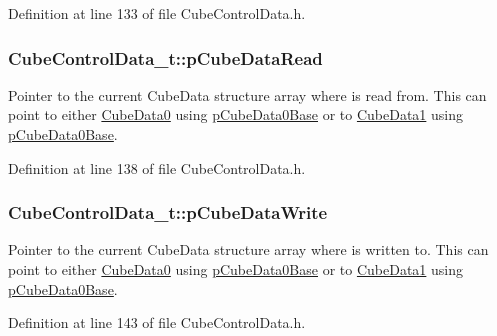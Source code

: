 Definition at line 133 of file Cube\+Control\+Data.\+h.

\hypertarget{struct_cube_control_data__t_a981fbbdd6a05af493c7ae6782bdcb9af}{}
\subsubsection[{p\+Cube\+Data\+Read}]{ Cube\+Control\+Data\+\_\+t\+::p\+Cube\+Data\+Read}\label{struct_cube_control_data__t_a981fbbdd6a05af493c7ae6782bdcb9af}
Pointer to the current Cube\+Data structure array where is read from. This can point to either \hyperlink{struct_cube_control_data__t_a4fcbd72fab1f862e17acc3f96efe8d4c}{Cube\+Data0} using \hyperlink{_cube_control_data_8c_ae726beefa78aea201161f0cf5744dcee}{p\+Cube\+Data0\+Base} or to \hyperlink{struct_cube_control_data__t_a647ae59f9e5f0842d92ef0241db2a141}{Cube\+Data1} using \hyperlink{_cube_control_data_8c_ae726beefa78aea201161f0cf5744dcee}{p\+Cube\+Data0\+Base}. 

Definition at line 138 of file Cube\+Control\+Data.\+h.

\hypertarget{struct_cube_control_data__t_aa60f6c5f56c138fba459e0a990248e0f}{}
\subsubsection[{p\+Cube\+Data\+Write}]{ Cube\+Control\+Data\+\_\+t\+::p\+Cube\+Data\+Write}\label{struct_cube_control_data__t_aa60f6c5f56c138fba459e0a990248e0f}
Pointer to the current Cube\+Data structure array where is written to. This can point to either \hyperlink{struct_cube_control_data__t_a4fcbd72fab1f862e17acc3f96efe8d4c}{Cube\+Data0} using \hyperlink{_cube_control_data_8c_ae726beefa78aea201161f0cf5744dcee}{p\+Cube\+Data0\+Base} or to \hyperlink{struct_cube_control_data__t_a647ae59f9e5f0842d92ef0241db2a141}{Cube\+Data1} using \hyperlink{_cube_control_data_8c_ae726beefa78aea201161f0cf5744dcee}{p\+Cube\+Data0\+Base}. 

Definition at line 143 of file Cube\+Control\+Data.\+h.

